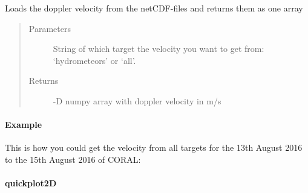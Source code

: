 \documentclass[letterpaper,10pt,english]{sphinxmanual}
\begin{document}
\begin{fulllineitems}
\begin{fulllineitems}
\label{\detokenize{generated/MPPy.Instruments.Radar.Radar.getVelocity:MPPy.Instruments.Radar.Radar.getVelocity}}
Loads the doppler velocity from the netCDF-files and returns them as one array
\begin{quote}\begin{description}
\item[{Parameters}] \leavevmode
{} \textendash{} String of which target the velocity you want to get from: ‘hydrometeors’ or ‘all’.

\item[{Returns}] -D numpy array with doppler velocity in m/s

\end{description}\end{quote}
\paragraph{Example}

This is how you could get the velocity from all targets for the 13th August 2016 to the 15th August 2016
of CORAL:

\begin{sphinxVerbatim}[commandchars=\\\{\}]
   
  
\end{sphinxVerbatim}

\end{fulllineitems}



\paragraph{quickplot2D}
\label{\detokenize{generated/MPPy.Instruments.Radar.Radar.quickplot2D::doc}}\label{\detokenize{generated/MPPy.Instruments.Radar.Radar.quickplot2D:quickplot2d}}


\end{fulllineitems}
\end{document}
